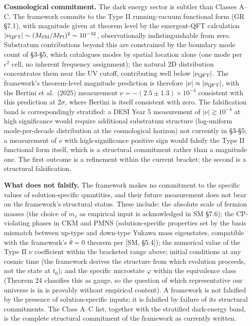 \documentclass[
]{article}
\begin{document}
\textbf{Cosmological commitment.} The dark energy sector is subtler than
Classes A--C. The framework commits to the Type II running-vacuum
functional form (GR §7.1), with magnitude given at theorem level by the
emergent-QFT calculation
\(|\nu_{\rm QFT}| \sim (M_{\rm SM}/M_{\rm Pl})^2 \sim 10^{-32}\),
observationally indistinguishable from zero. Substratum contributions
beyond this are constrained by the boundary mode count of §3-§5, which
catalogues modes by spatial location alone (one mode per \(\epsilon^2\)
cell, no inherent frequency assignment); the natural 2D distribution
concentrates them near the UV cutoff, contributing well below
\(|\nu_{\rm QFT}|\). The framework's theorem-level magnitude prediction
is therefore \(|\nu| \approx |\nu_{\rm QFT}|\), with the Bertini et
al.~(2025) measurement \(\nu = -(2.5 \pm 1.3) \times 10^{-4}\)
consistent with this prediction at \(2\sigma\), where Bertini is itself
consistent with zero. The falsification band is correspondingly
stratified: a DESI Year 5 measurement of \(|\nu| \gtrsim 10^{-4}\) at
high significance would require additional substratum structure
(log-uniform mode-per-decade distribution at the cosmological horizon)
not currently in §3-§5; a measurement of \(\nu\) with high-significance
positive sign would falsify the Type II functional form itself, which is
a structural commitment rather than a magnitude one. The first outcome
is a refinement within the current bracket; the second is a structural
falsification.

\textbf{What does not falsify.} The framework makes no commitment to the
specific values of solution-specific quantities, and their future
measurement does not bear on the framework's structural status. These
include: the absolute scale of fermion masses (the choice of \(m_s\) as
empirical input is acknowledged in SM §7.6); the CP-violating phases in
CKM and PMNS (solution-specific properties set by the basis mismatch
between up-type and down-type Yukawa mass eigenstates, compatible with
the framework's \(\bar\theta = 0\) theorem per {[}SM, §5.4{]}); the
numerical value of the Type II \(\nu\) coefficient within the bracketed
range above; initial conditions at any cosmic time (the framework
derives the structure from which evolution proceeds, not the state at
\(t_0\)); and the specific microstate \(\varphi\) within the equivalence
class (Theorem 24 classifies this as gauge, so the question of which
representative our universe is in is provably without empirical
content). A framework is not falsified by the presence of
solution-specific inputs; it is falsified by failure of its structural
commitments. The Class A--C list, together with the stratified
dark-energy band, is the complete structural commitment of the framework
as currently written.
\end{document}
